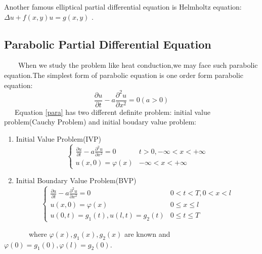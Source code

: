 \documentclass[a4paper]{article}
\newenvironment{enumeratenumeric}{\begin{enumerate}[1.] }{\end{enumerate}}
\begin{document}
Another famous elliptical partial differential equation is Helmholtz
equation:$\Delta u + f \left( x, y \right) u = g \left( x, y
\right)${\cite{Peaceman&Rachford}}
.

\subsection{Parabolic Partial Differential Equation}

\ \ \ \ When we study the problem like heat conduction,we may face such
parabolic equation.The simplest form of parabolic equation is one order form
parabolic equation:
\begin{equation}
  \frac{\partial u}{\partial t} - a \frac{\partial^2 u}{\partial x^2} = 0
  \left( a > 0 \right) \label{para}
\end{equation}
\ \ \ Equation \ref{para} has two different definite problem: initial value
problem(Cauchy Problem) and initial boudary value problem:
\begin{enumeratenumeric}
  \item Initial Value Problem(IVP)
  \begin{equation}
    \left\{ \begin{array}{ll}
      \frac{\partial u}{\partial t} - a \frac{\partial^2 u}{\partial x^2} = 0
      & t > 0, - \infty < x < + \infty\\
      u \left( x, 0 \right) = \varphi \left( x \right) & - \infty < x < +
      \infty
    \end{array} \right.
  \end{equation}
  \item Initial Boundary Value Problem(BVP)
  \begin{equation}
    \left\{ \begin{array}{ll}
      \frac{\partial u}{\partial t} - a \frac{\partial^2 u}{\partial x^2} = 0
      & 0 < t < T, 0 < x < l\\
      u \left( x, 0 \right) = \varphi \left( x \right) & 0 \leqslant x
      \leqslant l\\
      u \left( 0, t \right) = g_1 \left( t \right), u \left( l, t \right) =
      g_2 \left( t \right) & 0 \leqslant t \leqslant T
    \end{array} \right.
  \end{equation}
\end{enumeratenumeric}
\ \ \ \ \ \ \ where $\varphi \left( x \right), g_1 \left( x \right), g_2
\left( x \right)$ are known and $\varphi \left( 0 \right) = g_1 \left( 0
\right), \varphi \left( l \right) = g_2 \left( 0 \right)$.
\end{document}
